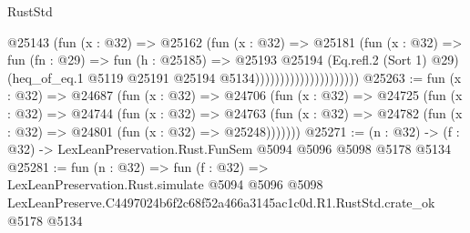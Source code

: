 \begin{lexlean}{RustStd}
\begin{coremodule}
                                    @25143
                                      (fun (x : @32) =>
                                      @25162
                                        (fun (x : @32) =>
                                        @25181
                                          (fun (x : @32) =>
                                          fun (fn : @29) =>
                                          fun (h : @25185) =>
                                          @25193
                                            @25194
                                            (Eq.refl.{2} (Sort 1) @29)
                                            (heq_of_eq.{1}
                                              @5119
                                              @25191
                                              @25194
                                              @5134)))))))))))))))))))))
@25263 := fun (x : @32) =>
  @24687
    (fun (x : @32) =>
    @24706
      (fun (x : @32) =>
      @24725
        (fun (x : @32) =>
        @24744
          (fun (x : @32) =>
          @24763 (fun (x : @32) => @24782 (fun (x : @32) => @24801 (fun (x : @32) => @25248)))))))
@25271 := (n : @32) -> (f : @32) -> LexLeanPreservation.Rust.FunSem @5094 @5096 @5098 @5178 @5134
@25281 := fun (n : @32) =>
  fun (f : @32) =>
  LexLeanPreservation.Rust.simulate
    @5094
    @5096
    @5098
    LexLeanPreserve.C4497024b6f2c68f52a466a3145ac1c0d.R1.RustStd.crate_ok
    @5178
    @5134
\end{coremodule}
\end{lexlean}
